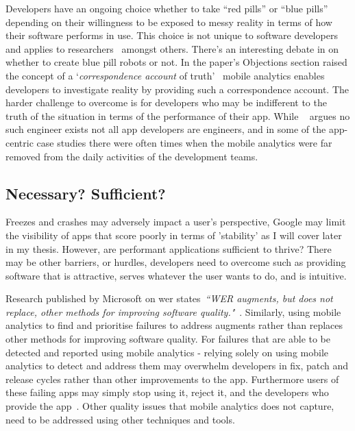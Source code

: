 Developers have an ongoing choice whether to take ``red pills'' or ``blue pills''~ depending on their willingness to be exposed to messy reality in terms of how their software performs in use. This choice is not unique to software developers and applies to researchers~ amongst others. There's an interesting debate in  on whether to create blue pill robots or not. In the paper's Objections section raised the concept of a `\textit{correspondence account} of truth'~ mobile analytics enables developers to investigate reality by providing such a correspondence account. The harder challenge to overcome is for developers who may be indifferent to the truth of the situation in terms of the performance of their app. While ~ argues no such engineer exists not all app developers are engineers, and in some of the app-centric case studies there were often times when the mobile analytics were far removed from the daily activities of the development teams.

\subsection{Necessary? Sufficient?}
Freezes and crashes may adversely impact a user's perspective, Google may limit the visibility of apps that score poorly in terms of 'stability' as I will cover later in my thesis. However, are performant applications sufficient to thrive? There may be other barriers, or hurdles, developers need to overcome such as providing software that is attractive, serves whatever the user wants to do, and is intuitive.

Research published by Microsoft on \Gls{wer} states~\emph{``WER augments, but does not replace, other methods for improving software quality."}~. Similarly, using mobile analytics to find and prioritise failures to address augments rather than replaces other methods for improving software quality. For failures that are able to be detected and reported using mobile analytics - relying solely on using mobile analytics to detect and address them may overwhelm developers in fix, patch and release cycles rather than other improvements to the app. Furthermore users of these failing apps may simply stop using it, reject it, and the developers who provide the app~. Other quality issues that mobile analytics does not capture, need to be addressed using other techniques and tools.

